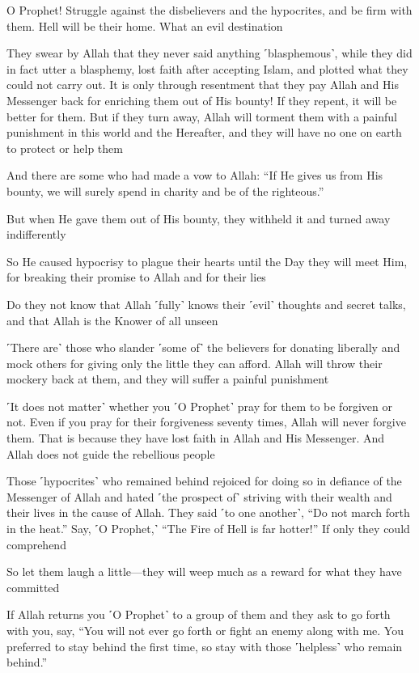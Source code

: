 O Prophet! Struggle against the disbelievers and the hypocrites, and be firm with them. Hell will be their home. What an evil destination

They swear by Allah that they never said anything ˹blasphemous˺, while they did in fact utter a blasphemy, lost faith after accepting Islam, and plotted what they could not carry out. It is only through resentment that they pay Allah and His Messenger back for enriching them out of His bounty! If they repent, it will be better for them. But if they turn away, Allah will torment them with a painful punishment in this world and the Hereafter, and they will have no one on earth to protect or help them

And there are some who had made a vow to Allah: “If He gives us from His bounty, we will surely spend in charity and be of the righteous.”

But when He gave them out of His bounty, they withheld it and turned away indifferently

So He caused hypocrisy to plague their hearts until the Day they will meet Him, for breaking their promise to Allah and for their lies

Do they not know that Allah ˹fully˺ knows their ˹evil˺ thoughts and secret talks, and that Allah is the Knower of all unseen

˹There are˺ those who slander ˹some of˺ the believers for donating liberally and mock others for giving only the little they can afford. Allah will throw their mockery back at them, and they will suffer a painful punishment

˹It does not matter˺ whether you ˹O Prophet˺ pray for them to be forgiven or not. Even if you pray for their forgiveness seventy times, Allah will never forgive them. That is because they have lost faith in Allah and His Messenger. And Allah does not guide the rebellious people

Those ˹hypocrites˺ who remained behind rejoiced for doing so in defiance of the Messenger of Allah and hated ˹the prospect of˺ striving with their wealth and their lives in the cause of Allah. They said ˹to one another˺, “Do not march forth in the heat.” Say, ˹O Prophet,˺ “The Fire of Hell is far hotter!” If only they could comprehend

So let them laugh a little—they will weep much as a reward for what they have committed

If Allah returns you ˹O Prophet˺ to a group of them and they ask to go forth with you, say, “You will not ever go forth or fight an enemy along with me. You preferred to stay behind the first time, so stay with those ˹helpless˺ who remain behind.”

